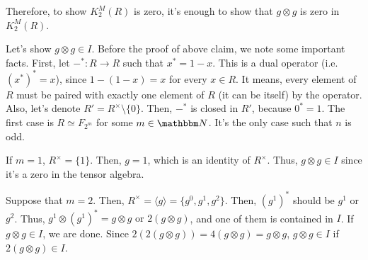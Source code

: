 Therefore, to show \(K_2^M(R)\) is zero, 
it's enough to show that \(g \otimes g\) is zero in \(K_2^M(R)\).

Let's show \(g \otimes g \in I\).
\br
\noindent
Before the proof of above claim, we note some important facts.
First, let \(-^*: R \to R\) such that \(x^* = 1 - x\).
This is a dual operator (i.e. \((x^*)^* = x\)),
since \(1 - (1 - x) = x\) for every \(x \in R\).
It means, every element of \(R\) must be paired with exactly one element of \(R\) (it can be itself) by the operator.
Also, let's denote \(R' = R^\times \setminus \{0\}\).
Then, \(-^*\) is closed in \(R'\), because \(0^* = 1\).
\br
\noindent
The first case is \(R \simeq F_{2^m}\) for some \(m \in \bbN\).
It's the only case such that \(n\) is odd.

If \(m = 1\), \(R^\times = \{1\}\).
Then, \(g = 1\), which is an identity of \(R^\times\).
Thus, \(g \otimes g \in I\) since it's a zero in the tensor algebra.

Suppose that \(m = 2\).
Then, \(R^\times = \langle g \rangle = \{g^0, g^1, g^2\}\).
Then, \((g^1)^*\) should be \(g^1\) or \(g^2\).
Thus, \(g^1 \otimes (g^1)^* = g \otimes g \text{ or } 2(g \otimes g)\),
and one of them is contained in \(I\).
If \(g \otimes g \in I\), we are done.
Since \(2 (2 (g \otimes g)) = 4 (g \otimes g) = g \otimes g\),
\(g \otimes g \in I\) if \(2 (g \otimes g) \in I\).

